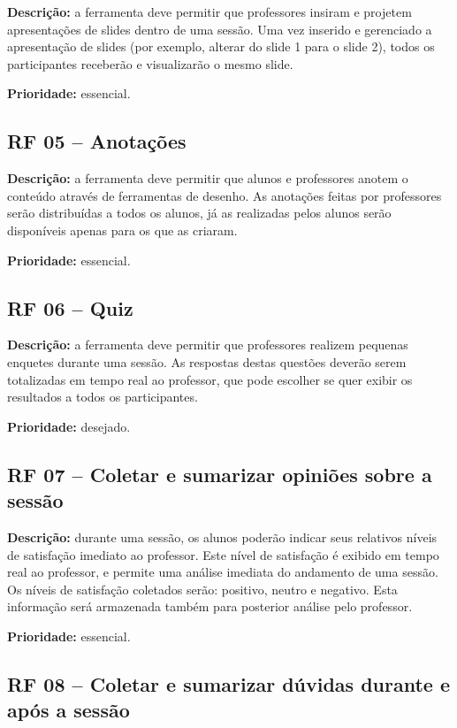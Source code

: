 \textbf{Descrição:} a ferramenta deve permitir que professores insiram e projetem apresentações de slides dentro de uma sessão. Uma vez inserido e gerenciado a apresentação de slides (por exemplo, alterar do slide 1 para o slide 2), todos os participantes receberão e visualizarão o mesmo slide.

\textbf{Prioridade:} essencial.

\subsection{RF 05 – Anotações}

\textbf{Descrição:} a ferramenta deve permitir que alunos e professores anotem o conteúdo através de ferramentas de desenho. As anotações feitas por professores serão distribuídas a todos os alunos, já as realizadas pelos alunos serão disponíveis apenas para os que as criaram.

\textbf{Prioridade:} essencial.

\subsection{RF 06 – Quiz}

\textbf{Descrição:} a ferramenta deve permitir que professores realizem pequenas enquetes durante uma sessão. As respostas destas questões deverão serem totalizadas em tempo real ao professor, que pode escolher se quer exibir os resultados a todos os participantes.

\textbf{Prioridade:} desejado.

\subsection{RF 07 – Coletar e sumarizar opiniões sobre a sessão}

\textbf{Descrição:} durante uma sessão, os alunos poderão indicar seus relativos níveis de satisfação imediato ao professor. Este nível de satisfação é exibido em tempo real ao professor, e permite uma análise imediata do andamento de uma sessão. Os níveis de satisfação coletados serão: positivo, neutro e negativo. Esta informação será armazenada também para posterior análise pelo professor.

\textbf{Prioridade:} essencial.

\subsection{RF 08 – Coletar e sumarizar dúvidas durante e após a sessão}

